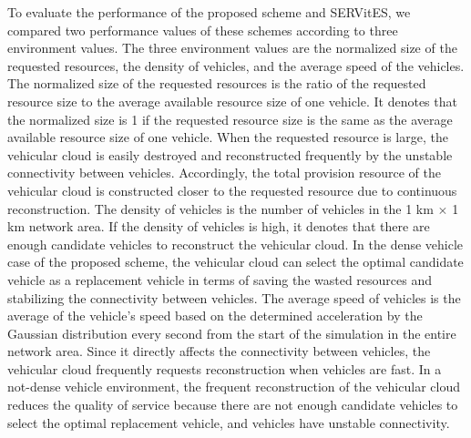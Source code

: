 \documentclass[electronics,aricle,accept,pdftex,moreauthors]{Definitions/mdpi}
\begin{document}
To evaluate the performance of the proposed scheme and SERVitES, we compared two performance values of these schemes according to three environment values.
The three environment values are the normalized size of the requested resources, the density of vehicles, and the average speed of the vehicles.
The normalized size of the requested resources is the ratio of the requested resource size to the average available resource size of one vehicle.
It denotes that the normalized size is 1 if the requested resource size is the same as the average available resource size of one vehicle.
When the requested resource is large, the vehicular cloud is easily destroyed and reconstructed frequently by the unstable connectivity between vehicles.
Accordingly, the total provision resource of the vehicular cloud is constructed closer to the requested resource due to continuous reconstruction.
The density of vehicles is the number of vehicles in the 1 km $\times$ 1 km network area.
If the density of vehicles is high, it denotes that there are enough candidate vehicles to reconstruct the vehicular cloud.
In the dense vehicle case of the proposed scheme, the vehicular cloud can select the optimal candidate vehicle as a replacement vehicle in terms of saving the wasted resources and stabilizing the connectivity between vehicles.
The average speed of vehicles is the average of the vehicle's speed based on the determined acceleration by the Gaussian distribution every second from the start of the simulation in the entire network area.
Since it directly affects the connectivity between vehicles, the vehicular cloud frequently requests reconstruction when vehicles are fast.
In a not-dense vehicle environment, the frequent reconstruction of the vehicular cloud reduces the quality of service because there are not enough candidate vehicles to select the optimal replacement vehicle, and vehicles have unstable connectivity.



%
\end{document}
